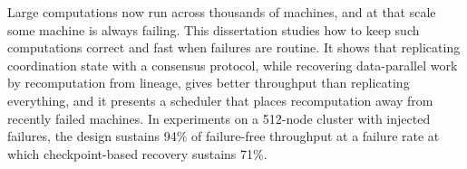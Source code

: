 Large computations now run across thousands of machines, and at that scale some machine is
always failing. This dissertation studies how to keep such computations correct and fast when
failures are routine. It shows that replicating coordination state with a consensus protocol,
while recovering data-parallel work by recomputation from lineage, gives better throughput than
replicating everything, and it presents a scheduler that places recomputation away from
recently failed machines. In experiments on a 512-node cluster with injected failures, the
design sustains 94\% of failure-free throughput at a failure rate at which checkpoint-based
recovery sustains 71\%.
